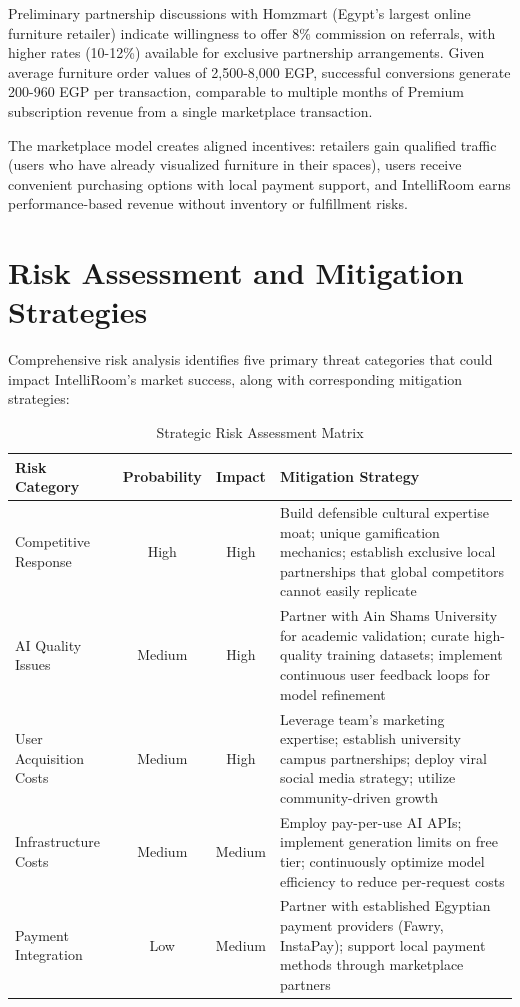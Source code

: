 Preliminary partnership discussions with Homzmart (Egypt's largest online furniture retailer) indicate willingness to offer 8\% commission on referrals, with higher rates (10-12\%) available for exclusive partnership arrangements. Given average furniture order values of 2,500-8,000 EGP, successful conversions generate 200-960 EGP per transaction, comparable to multiple months of Premium subscription revenue from a single marketplace transaction.

The marketplace model creates aligned incentives: retailers gain qualified traffic (users who have already visualized furniture in their spaces), users receive convenient purchasing options with local payment support, and IntelliRoom earns performance-based revenue without inventory or fulfillment risks.

\section{Risk Assessment and Mitigation Strategies}
\label{sec:app_risk_assessment}

Comprehensive risk analysis identifies five primary threat categories that could impact IntelliRoom's market success, along with corresponding mitigation strategies:

\begin{table}[htbp]
\centering
\caption{Strategic Risk Assessment Matrix}
\label{tab:risk_matrix}
\begin{tabular}{p{3cm}ccp{6cm}}
\toprule
\textbf{Risk Category} & \textbf{Probability} & \textbf{Impact} & \textbf{Mitigation Strategy} \\
\midrule
Competitive Response & High & High & Build defensible cultural expertise moat; unique gamification mechanics; establish exclusive local partnerships that global competitors cannot easily replicate \\
AI Quality Issues & Medium & High & Partner with Ain Shams University for academic validation; curate high-quality training datasets; implement continuous user feedback loops for model refinement \\
User Acquisition Costs & Medium & High & Leverage team's marketing expertise; establish university campus partnerships; deploy viral social media strategy; utilize community-driven growth \\
Infrastructure Costs & Medium & Medium & Employ pay-per-use AI APIs; implement generation limits on free tier; continuously optimize model efficiency to reduce per-request costs \\
Payment Integration & Low & Medium & Partner with established Egyptian payment providers (Fawry, InstaPay); support local payment methods through marketplace partners \\
\bottomrule
\end{tabular}
\end{table}

